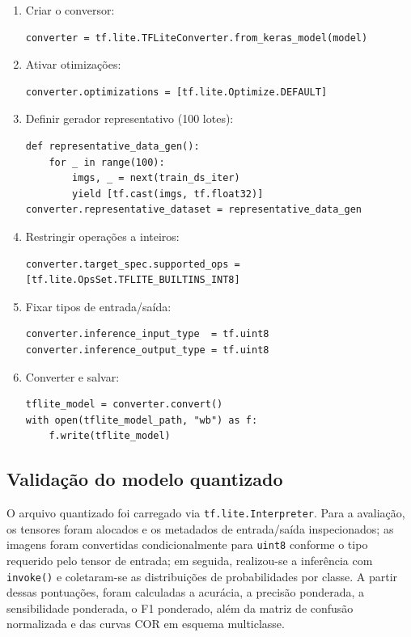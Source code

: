 \documentclass[repeatfields,xlists,xpacks,oneside]{ufrgscca}
\begin{document}
\begin{enumerate}
  \item Criar o conversor:
\begin{lstlisting}
converter = tf.lite.TFLiteConverter.from_keras_model(model)
\end{lstlisting}

  \item Ativar otimizações:
\begin{lstlisting}
converter.optimizations = [tf.lite.Optimize.DEFAULT]
\end{lstlisting}

  \item Definir gerador representativo (100 lotes):
\begin{lstlisting}
def representative_data_gen():
    for _ in range(100):
        imgs, _ = next(train_ds_iter)
        yield [tf.cast(imgs, tf.float32)]
converter.representative_dataset = representative_data_gen
\end{lstlisting}

  \item Restringir operações a inteiros:
\begin{lstlisting}
converter.target_spec.supported_ops = [tf.lite.OpsSet.TFLITE_BUILTINS_INT8]
\end{lstlisting}

  \item Fixar tipos de entrada/saída:
\begin{lstlisting}
converter.inference_input_type  = tf.uint8
converter.inference_output_type = tf.uint8
\end{lstlisting}

  \item Converter e salvar:
\begin{lstlisting}
tflite_model = converter.convert()
with open(tflite_model_path, "wb") as f:
    f.write(tflite_model)
\end{lstlisting}
\end{enumerate}

\subsection{Validação do modelo quantizado}
O arquivo quantizado foi carregado via \texttt{tf.lite.Interpreter}. Para a avaliação, os tensores foram alocados e os metadados de entrada/saída inspecionados; as imagens foram convertidas condicionalmente para \texttt{uint8} conforme o tipo requerido pelo tensor de entrada; em seguida, realizou-se a inferência com \texttt{invoke()} e coletaram-se as distribuições de probabilidades por classe. A partir dessas pontuações, foram calculadas a acurácia, a precisão ponderada, a sensibilidade ponderada, o F1 ponderado, além da matriz de confusão normalizada e das curvas COR em esquema multiclasse.
\end{document}

